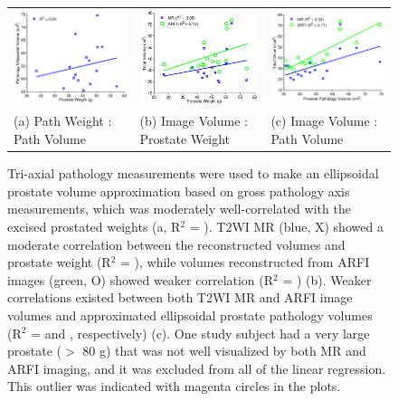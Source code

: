 \begin{figure}[htb!]
\centering
\begin{tabular}{lll}
\includegraphics[width=0.3\linewidth]{figs/corr_path_vol_weight_vol} &
\includegraphics[width=0.3\linewidth]{figs/corr_weight_vol} &
\includegraphics[width=0.3\linewidth]{figs/corr_pathVol_vol} \\
(a) Path Weight : Path Volume & (b) Image Volume : Prostate Weight & (c) Image Volume : Path Volume \\
\end{tabular}
\caption{Tri-axial pathology measurements were used to make an ellipsoidal
    prostate volume approximation based on gross pathology axis measurements,
    which was moderately well-correlated with the excised prostated weights (a,
    R$^2$ = \pathVolWeightRsq).  T2WI MR (blue, X) showed a moderate
    correlation between the reconstructed volumes and prostate weight (R$^2$ =
    \weightMRrsq), while volumes reconstructed from ARFI images (green, O)
    showed weaker correlation (R$^2$ = \weightARFIrsq) (b).  Weaker
    correlations existed between both T2WI MR and ARFI image volumes and
    approximated ellipsoidal prostate pathology volumes (R$^2$ = \pathVolMRrsq
    and \pathVolARFIrsq, respectively) (c).  One study subject had a very large
    prostate ($>$ 80 g) that was not well visualized by both MR and ARFI
    imaging, and it was excluded from all of the linear regression.  This
    outlier was indicated with magenta circles in the plots.}
\label{fig:mr_arfi_weight}
\end{figure}
